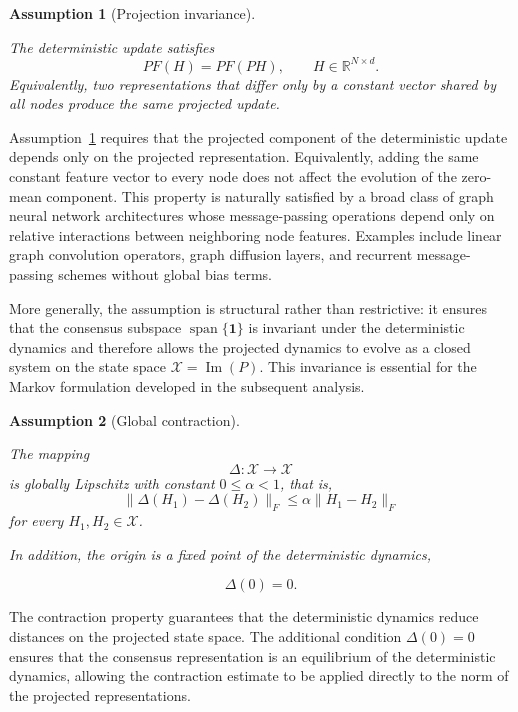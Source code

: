 \documentclass{article}
\newtheorem{assumption}{Assumption}[section]
\begin{document}

\begin{assumption}[Projection invariance]
	\label{ass:projection}
	
	The deterministic update satisfies	
	\[
	PF(H)
	=
	PF(PH),
	\qquad
	H\in\mathbb R^{N\times d}.
	\]
	Equivalently, two representations that differ only by a constant vector
	shared by all nodes produce the same projected update.
	
\end{assumption}


Assumption~\ref{ass:projection} requires that the projected component of
the deterministic update depends only on the projected representation.
Equivalently, adding the same constant feature vector to every node does
not affect the evolution of the zero-mean component.
This property is naturally satisfied by a broad class of graph neural
network architectures whose message-passing operations depend only on
relative interactions between neighboring node features.
Examples include linear graph convolution operators, graph diffusion
layers, and recurrent message-passing schemes without global bias terms.

More generally, the assumption is structural rather than restrictive: it
ensures that the consensus subspace
$\operatorname{span}\{\mathbf 1\}$ is invariant under the deterministic
dynamics and therefore allows the projected dynamics to evolve as a
closed system on the state space
$\mathcal X=\operatorname{Im}(P)$.
This invariance is essential for the Markov formulation developed in the
subsequent analysis.


\begin{assumption}[Global contraction]
	\label{ass:contraction}
	
	The mapping	
	\[
	\Delta:\mathcal X\rightarrow\mathcal X
	\]	
	is globally Lipschitz with constant
	\(
	0\le\alpha<1
	\),
	that is,	
	\[
	\|
	\Delta(H_1)-\Delta(H_2)
	\|_F
	\le
	\alpha
	\|
	H_1-H_2
	\|_F
	\]
	for every
	$H_1,H_2\in\mathcal X$.
	
	In addition, the origin is a fixed point of the deterministic dynamics,
	
	\[
	\boxed{\Delta(0)=0.}
	\]
	
\end{assumption}

The contraction property guarantees that the deterministic dynamics
reduce distances on the projected state space.
The additional condition
$\Delta(0)=0$
ensures that the consensus representation is an equilibrium of the
deterministic dynamics, allowing the contraction estimate to be applied
directly to the norm of the projected representations.
\end{document}
